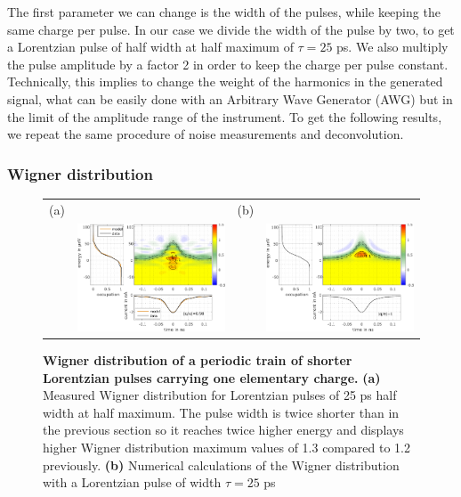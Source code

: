 The first parameter we can change is the width of the pulses, while keeping the same charge per pulse.
In our case we divide the width of the pulse by two, to get a Lorentzian pulse of half width at half maximum of $\tau = 25$ ps.
We also multiply the pulse amplitude by a factor 2 in order to keep the charge per pulse constant.
Technically, this implies to change the weight of the harmonics in the generated signal, what can be easily done with an Arbitrary Wave Generator (AWG) but in the limit of the amplitude range of the instrument. 
To get the following results, we repeat the same procedure of noise measurements and deconvolution.

\subsubsection*{Wigner distribution}

\begin{figure}[hpbt]
	\begin{center}
		\begin{tabular}{c c c c}
		(a) & & (b) &   \\ 
		& \includegraphics[width = 6.5cm]{./chap1/wigData_leviton_20ps_1e_51mK_Projected_Gradient_Method} &
		& \includegraphics[width = 6.5cm]{./chap1/wigTheory_leviton_25ps_1e_50mK_6th_harm}
		\end{tabular} 
	\end{center}
	\caption{\textbf{Wigner distribution of a periodic train of shorter Lorentzian pulses carrying one elementary charge.} \textbf{(a)} Measured Wigner distribution for Lorentzian pulses of 25 ps half width at half maximum. The pulse width is twice shorter than in the previous section so it reaches twice higher energy and displays higher Wigner distribution maximum values of 1.3 compared to 1.2 previously. \textbf{(b)} Numerical calculations of the Wigner distribution with a Lorentzian pulse of width $\tau = 25$ ps}
	\label{fig: wigner du 1e 20ps}
\end{figure}

